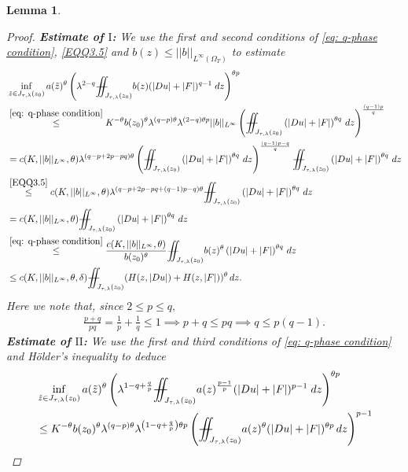 \documentclass[11pt,oneside, english,reqno,twoside a4paper]{amsart}
\newtheorem{lemma}{Lemma}[section]
\theoremstyle{definition}
\numberwithin{theorem}{section}
\numberwithin{equation}{section}
\newcommand{\iintss}{{\int\hspace{-0.28cm}\int}}
\newcommand{ \miints }{{\iintss\hspace{-0.56cm} -\hspace{-0.15cm}-}}
\newcommand{\miint}[1]{{\miints_{\hspace{-0.13cm}#1}}}
\begin{document}
\begin{lemma}
\begin{proof}
\noindent \textbf{Estimate of $\mathrm{I}$:}   We use the first and second conditions of  \eqref{eq: q-phase condition}, \eqref{EQQ3.5} and $b(z)\leq ||b||_{L^{\infty}(\Omega_T)}$ to estimate
\begin{align*}
 &\inf_{\tilde{z}\in J_{\tau, \lambda}(z_0)}a(\tilde{z})^{\theta}\left(\lambda^{2-q}\miint{J_{\tau,\lambda}(z_0)}b(z) (|Du|+|F|)^{q-1}\;dz \right)^{\theta p}\\
 &\overset{\eqref{eq: q-phase condition}}{\leq} K^{-\theta}b(z_0)^\theta \lambda^{(q-p)\theta} \lambda^{(2-q)\theta p}||b||_{L^{\infty}}\left(\miint{J_{\tau, \lambda}(z_0)}\left(|Du|+|F|\right)^{\theta q}\,dz\right)^{\frac{(q-1)p}{q}}\\
 &=c(K, ||b||_{L^{\infty}}, \theta)\lambda^{(q-p+2p-pq)\theta}\left(\miint{J_{\tau, \lambda}(z_0)}\left(|Du|+|F|\right)^{\theta q}\,dz\right)^{\frac{(q-1)p-q}{q}} \miint{J_{\tau, \lambda}(z_0)}\left(|Du|+|F|\right)^{\theta q}\,dz\\
 &\overset{\eqref{EQQ3.5}}{\leq} c(K, ||b||_{L^{\infty}}, \theta)\lambda^{(q-p+2p-pq+(q-1)p-q)\theta} \miint{J_{\tau, \lambda}(z_0)}\left(|Du|+|F|\right)^{\theta q}\,dz\\
 &=c(K, ||b||_{L^{\infty}}, \theta) \miint{J_{\tau, \lambda}(z_0)}\left(|Du|+|F|\right)^{\theta q}\,dz\\
 &\overset{\eqref{eq: q-phase condition}}{\leq}\frac{c(K, ||b||_{L^{\infty}}, \theta)}{b(z_0)^{\theta}} \miint{J_{\tau, \lambda}(z_0)}b(z)^{\theta}\left(|Du|+|F|\right)^{\theta q}\,dz\\
 &\leq c(K, ||b||_{L^{\infty}}, \theta, \delta)\miint{J_{\tau, \lambda}(z_0)}(H(z, |Du|)+H(z,|F|))^{\theta}\, dz.
\end{align*}
Here we note that, since $2\leq p\leq q,$
\begin{align*}
   \frac{p+q}{pq} = \frac{1}{p}+\frac{1}{q} \leq 1 \implies p+q\leq pq \implies q\leq p(q-1).
\end{align*}
\textbf{Estimate of $\mathrm{II}$:} We use the first and third conditions of \eqref{eq: q-phase condition} and H\"{o}lder's inequality to deduce
\begin{align*}
&\inf_{\tilde{z}\in J_{\tau, \lambda}(z_0)}a(\tilde{z})^{\theta}\left(\lambda^{1-q+\frac{q}{p}}\miint{J_{\tau,\lambda}(z_0)} a(z)^{\frac{p-1}{p}}(|Du|+|F|)^{p-1}\; dz \right)^{\theta p}\\
&\leq K^{-\theta}b(z_0)^{\theta}\lambda^{(q-p)\theta}\lambda^{\left(1-q+\frac{q}{p}\right)\theta p}\left(\miint{J_{\tau, \lambda}(z_0)}a(z)^{\theta}(|Du|+|F|)^{\theta p}\,dz\right)^{p-1}\\

\end{align*}
\end{proof}
\end{lemma}
\end{document}
